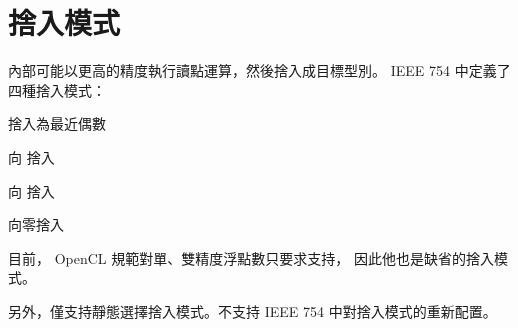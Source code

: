\section[sec:roundingMode]{捨入模式}

內部可能以更高的精度執行讀點運算，然後捨入成目標型別。
IEEE 754 中定義了四種捨入模式：
\startigBase
\item 捨入為最近偶數
\item 向 \math{+\infty} 捨入
\item 向 \math{-\infty} 捨入
\item 向零捨入
\stopigBase

目前， OpenCL 規範對單、雙精度浮點數只要求支持{}，
因此他也是缺省的捨入模式。

另外，僅支持靜態選擇捨入模式。不支持 IEEE 754 中對捨入模式的重新配置。

